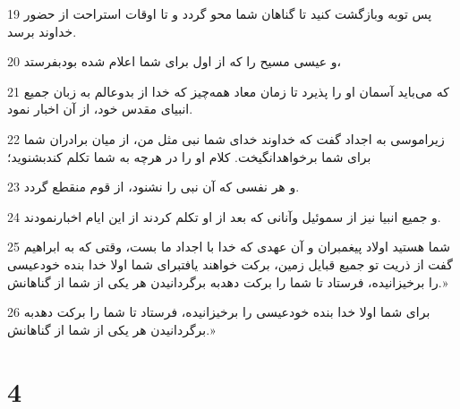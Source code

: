 \par 19 پس توبه وبازگشت کنید تا گناهان شما محو گردد و تا اوقات استراحت از حضور خداوند برسد.
\par 20 و عیسی مسیح را که از اول برای شما اعلام شده بودبفرستد،
\par 21 که می‌باید آسمان او را پذیرد تا زمان معاد همه‌چیز که خدا از بدوعالم به زبان جمیع انبیای مقدس خود، از آن اخبار نمود.
\par 22 زیراموسی به اجداد گفت که خداوند خدای شما نبی مثل من، از میان برادران شما برای شما برخواهدانگیخت. کلام او را در هر‌چه به شما تکلم کندبشنوید؛
\par 23 و هر نفسی که آن نبی را نشنود، از قوم منقطع گردد.
\par 24 و جمیع انبیا نیز از سموئیل وآنانی که بعد از او تکلم کردند از این ایام اخبارنمودند.
\par 25 شما هستید اولاد پیغمبران و آن عهدی که خدا با اجداد ما بست، وقتی که به ابراهیم گفت از ذریت تو جمیع قبایل زمین، برکت خواهند یافتبرای شما اولا خدا بنده خودعیسی را برخیزانیده، فرستاد تا شما را برکت دهدبه برگردانیدن هر یکی از شما از گناهانش.»
\par 26 برای شما اولا خدا بنده خودعیسی را برخیزانیده، فرستاد تا شما را برکت دهدبه برگردانیدن هر یکی از شما از گناهانش.»

\chapter{4}

